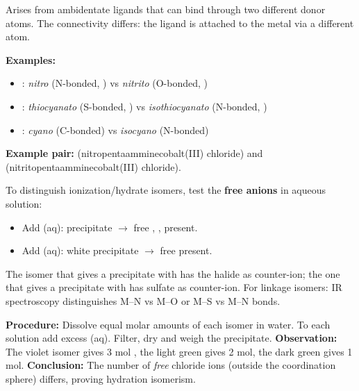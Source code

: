 \documentclass[11pt]{article}
\newcommand{\cle}[1]{{\popxbold\color{popdark}#1}}
\begin{document}
\begin{propriete}
Arises from \cle{ambidentate ligands} that can bind through two different donor atoms. The connectivity differs: the ligand is attached to the metal via a different atom.

\textbf{Examples:}
\begin{itemize}
\item {}: \textit{nitro} (N-bonded, ) vs \textit{nitrito} (O-bonded, )
\item {}: \textit{thiocyanato} (S-bonded, ) vs \textit{isothiocyanato} (N-bonded, )
\item {}: \textit{cyano} (C-bonded) vs \textit{isocyano} (N-bonded)
\end{itemize}
\textbf{Example pair:}  (nitropentaamminecobalt(III) chloride) and  (nitritopentaamminecobalt(III) chloride).
\end{propriete}

\begin{attention}
To distinguish ionization/hydrate isomers, test the \textbf{free anions} in aqueous solution:
\begin{itemize}
\item Add (aq): precipitate $\rightarrow$ free , ,  present.
\item Add (aq): white precipitate $\rightarrow$ free  present.
\end{itemize}
The isomer that gives a precipitate with  has the halide as counter-ion; the one that gives a precipitate with  has sulfate as counter-ion.
For linkage isomers: IR spectroscopy distinguishes M–N vs M–O or M–S vs M–N bonds.
\end{attention}

\begin{experience}
\textbf{Procedure:} Dissolve equal molar amounts of each isomer in water. To each solution add excess (aq). Filter, dry and weigh the  precipitate.
\textbf{Observation:} The violet isomer gives 3 mol , the light green gives 2 mol, the dark green gives 1 mol.
\textbf{Conclusion:} The number of \textit{free} chloride ions (outside the coordination sphere) differs, proving hydration isomerism.
\end{experience}
\end{document}
